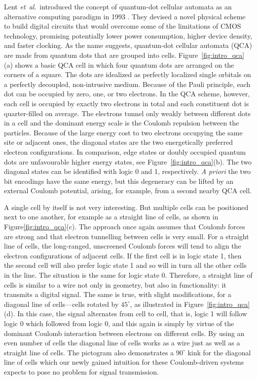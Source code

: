 Lent \emph{et~al}.\ introduced the concept of quantum-dot cellular automata as
an alternative computing paradigm in 1993 \cite{lent1993quantum}. They devised a
novel physical scheme to build digital circuits that would overcome some of the
limitations of CMOS technology, promising potentially lower power consumption,
higher device density, and faster clocking. As the name suggests, quantum-dot
cellular automata (QCA) are made from quantum dots that are grouped into cells.
Figure~\ref{fig:intro_qca}(a) shows a basic QCA cell in which four quantum dots
are arranged on the corners of a square. The dots are idealized as perfectly
localized single orbitals on a perfectly decoupled, non-intrusive medium.
Because of the Pauli principle, each dot can be occupied by zero, one, or two
electrons. In the QCA scheme, however, each cell is occupied by exactly two
electrons in total and each constituent dot is quarter-filled on average. The
electrons tunnel only weakly between different dots in a cell and the dominant
energy scale is the Coulomb repulsion between the particles. Because of the
large energy cost to two electrons occupying the same site or adjacent ones, the
diagonal states are the two energetically preferred electron configurations. In
comparison, edge states or doubly occupied quantum dots are unfavourable higher
energy states, see Figure~\ref{fig:intro_qca}(b). The two diagonal states can be
identified with logic 0 and 1, respectively. \emph{A priori} the two bit
encodings have the same energy, but this degeneracy can be lifted by an external
Coulomb potential, arising, for example, from a second nearby QCA cell.

A single cell by itself is not very interesting. But multiple cells can be
positioned next to one another, for example as a straight line of cells, as
shown in Figure\ref{fig:intro_qca}(c). The approach once again assumes that
Coulomb forces are strong and that electron tunnelling between cells is very
small. For a straight line of cells, the long-ranged, unscreened Coulomb
forces will tend to align the electron configurations of adjacent cells. If the
first cell is in logic state 1, then the second cell will also prefer logic state
1 and so will in turn all the other cells in the line. The situation is the same
for logic state 0. Therefore, a straight line of cells is similar to a wire not
only in geometry, but also in functionality: it transmits a digital signal. The
same is true, with slight modifications, for a diagonal line of cells---cells
rotated by $45^{\circ}$, as illustrated in Figure~\ref{fig:intro_qca}(d). In
this case, the signal
alternates from cell to cell, that is, logic 1 will follow logic 0 which
followed from logic 0, and this again is simply by virtue of the dominant
Coulomb interaction between electrons on different cells. By using an even
number of cells the diagonal line of cells works as a wire just as well as a
straight line of cells. The pictogram also demonstrates a $90^{\circ}$ kink for
the diagonal line of cells which our newly gained intuition for these
Coulomb-driven systems expects to pose no problem for signal transmission.

